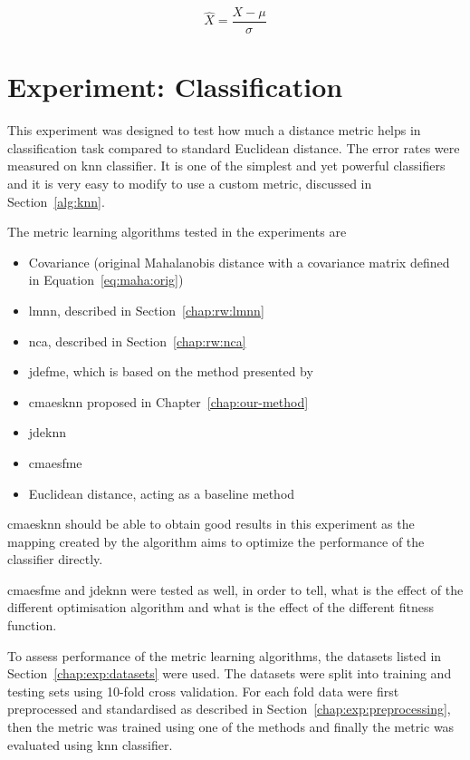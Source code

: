 \documentclass[12pt,a4paper]{report}
\begin{document}
\begin{equation} \label{eq:stand}
\hat{X} = \frac{X-\mu}{\sigma}
\end{equation}

\section{Experiment: Classification} \label{chap:exp:classification}

This experiment was designed to test how much a distance metric helps in classification task compared to standard Euclidean distance. The error rates were measured on \ac{knn} classifier. It is one of the simplest and yet powerful classifiers and it is very easy to modify to use a custom metric, discussed in Section~\ref{alg:knn}.

The metric learning algorithms tested in the experiments are 

\begin{itemize}
\item Covariance (original Mahalanobis distance with a covariance matrix defined in Equation~\ref{eq:maha:orig})
\item \ac{lmnn}, described in Section~\ref{chap:rw:lmnn}
\item \ac{nca}, described in Section~\ref{chap:rw:nca}
\item \ac{jdefme}, which is based on the method presented by~\citep{fukui2013evolutionary}

\item \ac{cmaesknn} proposed in Chapter~\ref{chap:our-method}

\item \acf{jdeknn}
\item \acf{cmaesfme}

\item Euclidean distance, acting as a baseline method
\end{itemize}

\ac{cmaesknn} should be able to obtain good results in this experiment as the mapping created by the algorithm aims to optimize the performance of the classifier directly.

\ac{cmaesfme} and \ac{jdeknn} were tested as well, in order to tell, what is the effect of the different optimisation algorithm and what is the effect of the different fitness function.

To assess performance of the metric learning algorithms, the datasets listed in Section~\ref{chap:exp:datasets} were used. The datasets were split into training and testing sets using 10-fold cross validation. For each fold data were first preprocessed and standardised as described in Section~\ref{chap:exp:preprocessing}, then the metric was trained using one of the methods and finally the metric was evaluated using \ac{knn} classifier.
\end{document}
